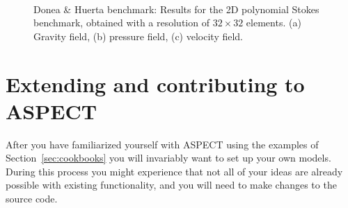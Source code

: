 \documentclass{article}
\newcommand{\aspect}{\textsc{ASPECT}}
\begin{document}
\begin{figure}[t!]
  \centering
  ~ 
  ~
  \caption{Donea \& Huerta benchmark: Results for the 2D polynomial Stokes benchmark, 
obtained with a resolution of $32\times 32$ elements. (a) Gravity field, (b) pressure field,
(c) velocity field. }\label{fig:doneahuerta-benchmark}
\end{figure}





\section{Extending and contributing to \aspect}
\label{sec:extending}

After you have familiarized yourself with \aspect{} using the examples of
Section~\ref{sec:cookbooks} you will invariably want to set up your own models.
During this process you might experience that not all of your ideas are already possible
with existing functionality, and you will need to make changes to the source code.
\end{document}
